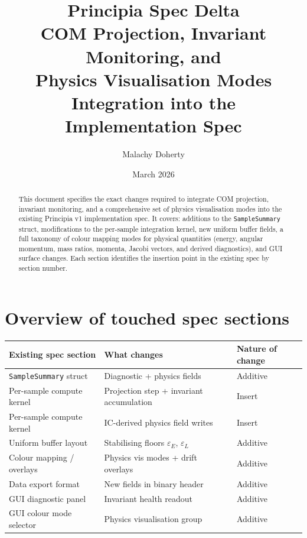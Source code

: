 \documentclass[11pt]{article}
\title{\textbf{Principia Spec Delta} \\[6pt]
\large COM Projection, Invariant Monitoring, and \\
Physics Visualisation Modes \\[4pt]
\normalsize Integration into the Implementation Spec}
\author{Malachy Doherty}
\date{March 2026}
\newcommand{\struct}[1]{\texttt{#1}}
\begin{document}
\maketitle

\begin{abstract}
This document specifies the exact changes required to integrate COM projection,
invariant monitoring, and a comprehensive set of physics visualisation modes
into the existing Principia v1 implementation spec. It covers: additions to
the \struct{SampleSummary} struct, modifications to the per-sample integration
kernel, new uniform buffer fields, a full taxonomy of colour mapping modes for
physical quantities (energy, angular momentum, mass ratios, momenta, Jacobi
vectors, and derived diagnostics), and GUI surface changes. Each section
identifies the insertion point in the existing spec by section number.
\end{abstract}

\tableofcontents
\newpage

\section{Overview of touched spec sections}

\begin{center}
\begin{tabular}{lll}
\toprule
Existing spec section & What changes & Nature of change \\
\midrule
\struct{SampleSummary} struct & Diagnostic + physics fields & Additive \\
Per-sample compute kernel & Projection step + invariant accumulation & Insert \\
Per-sample compute kernel & IC-derived physics field writes & Insert \\
Uniform buffer layout & Stabilising floors $\varepsilon_E$, $\varepsilon_L$ & Additive \\
Colour mapping / overlays & Physics vis modes + drift overlays & Additive \\
Data export format & New fields in binary header & Additive \\
GUI diagnostic panel & Invariant health readout & Additive \\
GUI colour mode selector & Physics visualisation group & Additive \\
\bottomrule
\end{tabular}
\end{center}
\end{document}
